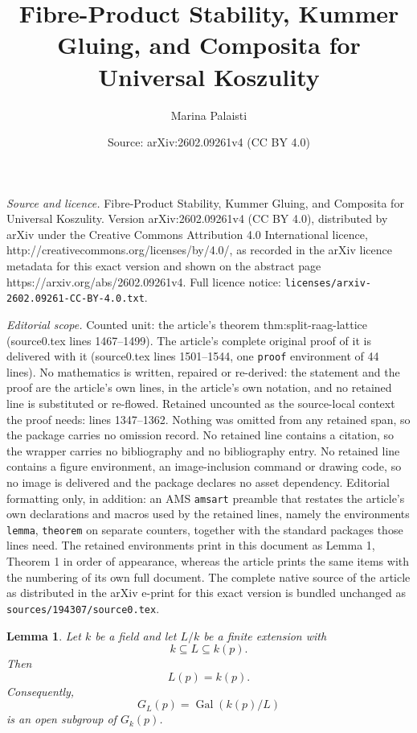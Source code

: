 \documentclass[10pt,a4paper]{amsart}
\title{Fibre-Product Stability, Kummer Gluing, and Composita for Universal Koszulity}
\author{Marina Palaisti}
\date{Source: arXiv:2602.09261v4 (CC BY 4.0)}
\newtheorem{lemma}{Lemma}
\begin{document}
\maketitle

\noindent\emph{Source and licence.} Fibre-Product Stability, Kummer Gluing, and Composita for Universal Koszulity. Version arXiv:2602.09261v4 (CC BY 4.0), distributed by arXiv under the Creative Commons Attribution 4.0 International licence, http://creativecommons.org/licenses/by/4.0/, as recorded in the arXiv licence metadata for this exact version and shown on the abstract page https://arxiv.org/abs/2602.09261v4. Full licence notice: \texttt{licenses/arxiv-2602.09261-CC-BY-4.0.txt}.\par\smallskip

\noindent\textit{Editorial scope.} Counted unit: the article's theorem thm:split-raag-lattice (source0.tex lines 1467--1499). The article's complete original proof of it is delivered with it (source0.tex lines 1501--1544, one \texttt{proof} environment of 44 lines). No mathematics is written, repaired or re-derived: the statement and the proof are the article's own lines, in the article's own notation, and no retained line is substituted or re-flowed.  Retained uncounted as the source-local context the proof needs: lines 1347--1362.  Nothing was omitted from any retained span, so the package carries no omission record.  No retained line contains a citation, so the wrapper carries no bibliography and no bibliography entry.  No retained line contains a figure environment, an image-inclusion command or drawing code, so no image is delivered and the package declares no asset dependency.  Editorial formatting only, in addition: an AMS \texttt{amsart} preamble that restates the article's own declarations and macros used by the retained lines, namely the environments \texttt{lemma}, \texttt{theorem} on separate counters, together with the standard packages those lines need.  The retained environments print in this document as Lemma 1, Theorem 1 in order of appearance, whereas the article prints the same items with the numbering of its own full document.  The complete native source of the article as distributed in the arXiv e-print for this exact version is bundled unchanged as \texttt{sources/194307/source0.tex}.
\begin{lemma}
\label{lem:persistence}
Let \(k\) be a field and let \(L/k\) be a finite extension with
\[
k\subseteq L\subseteq k(p).
\]
Then
\[
L(p)=k(p).
\]
Consequently,
\[
G_L(p)=\operatorname{Gal}(k(p)/L)
\]
is an open subgroup of \(G_k(p)\).
\end{lemma}
\end{document}
